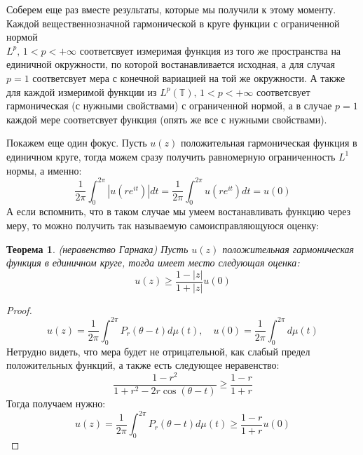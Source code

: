 \documentclass[12pt,a4paper]{article} %
\newtheorem{theorem}{Теорема}
\begin{document}
	Соберем еще раз вместе результаты, которые мы получили к этому моменту. Каждой вещественнозначной гармонической в круге функции с ограниченной нормой \\$L^p,\,1<p<+\infty$ соответсвует измеримая функция из того же пространства на  единичной окружности, по которой востанавливается исходная, а для случая $p=1$ соответсвует мера с конечной вариацией на той же окружности. А также для каждой измеримой функции из $L^p(\mathbb{T}),\,1<p<+\infty$ соответсвует гармоническая (с нужными свойствами) с ограниченной нормой, а в случае $p=1$ каждой мере соответсвует функция (опять же все с нужными свойствами).
	
	Покажем еще один фокус. Пусть $u(z)$ положительная гармоническая функция в единичном круге, тогда можем сразу получить равномерную ограниченность $L^1$ нормы, а именно:
	$$\frac{1}{2\pi}\int_0^{2\pi}|u(re^{it})|dt=\frac{1}{2\pi}\int_0^{2\pi}u(re^{it})dt=u(0)$$
	А если вспомнить, что в таком случае мы умеем востанавливать функцию через меру, то можно получить так называемую самоисправляющуюся оценку:
	\begin{theorem}
		(неравенство Гарнака) Пусть $u(z)$ положительная гармоническая функция в единичном круге, тогда имеет место следующая оценка:
		$$u(z)\geq\frac{1-|z|}{1+|z|}u(0)$$
	\end{theorem}
	\begin{proof}
		$$u(z)=\frac{1}{2\pi}\int_0^{2\pi}P_r(\theta-t)d\mu(t),\quad u(0)=\frac{1}{2\pi}\int_0^{2\pi}d\mu(t)$$
		Нетрудно видеть, что мера будет не отрицательной, как слабый предел положительных функций, а также есть следующее неравенство:
		$$\frac{1-r^2}{1+r^2-2r\cos(\theta-t)}\geq\frac{1-r}{1+r}$$
		Тогда получаем нужно:
		$$u(z)=\frac{1}{2\pi}\int_0^{2\pi}P_r(\theta-t)d\mu(t)\geq\frac{1-r}{1+r}u(0)$$
	\end{proof}
\end{document}

